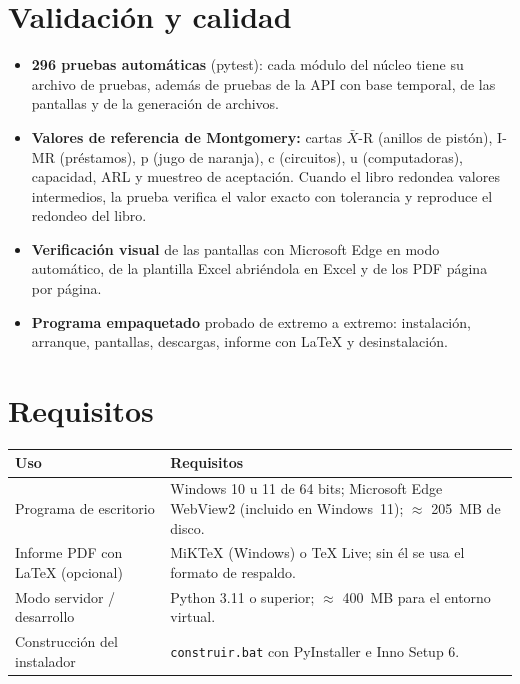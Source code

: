 \documentclass[11pt,a4paper]{article}
\begin{document}
\section{Validación y calidad}
\begin{itemize}
\item \textbf{296 pruebas automáticas} (pytest): cada módulo del núcleo tiene su archivo de
  pruebas, además de pruebas de la API con base temporal, de las pantallas y de la generación de
  archivos.
\item \textbf{Valores de referencia de Montgomery:} cartas $\bar{X}$-R (anillos de pistón), I-MR
  (préstamos), p (jugo de naranja), c (circuitos), u (computadoras), capacidad, ARL y muestreo de
  aceptación. Cuando el libro redondea valores intermedios, la prueba verifica el valor exacto
  con tolerancia y reproduce el redondeo del libro.
\item \textbf{Verificación visual} de las pantallas con Microsoft Edge en modo automático, de la
  plantilla Excel abriéndola en Excel y de los PDF página por página.
\item \textbf{Programa empaquetado} probado de extremo a extremo: instalación, arranque,
  pantallas, descargas, informe con LaTeX y desinstalación.
\end{itemize}

\section{Requisitos}

\begin{tabularx}{\linewidth}{@{}P{5cm}L@{}}
\toprule
\textbf{Uso} & \textbf{Requisitos}\\
\midrule
Programa de escritorio & Windows 10 u 11 de 64 bits; Microsoft Edge WebView2 (incluido en Windows~11); $\approx$ 205~MB de disco.\\
Informe PDF con LaTeX (opcional) & MiKTeX (Windows) o TeX Live; sin él se usa el formato de respaldo.\\
Modo servidor / desarrollo & Python 3.11 o superior; $\approx$ 400~MB para el entorno virtual.\\
Construcción del instalador & \texttt{construir.bat} con PyInstaller e Inno Setup 6.\\
\bottomrule
\end{tabularx}

\end{document}
